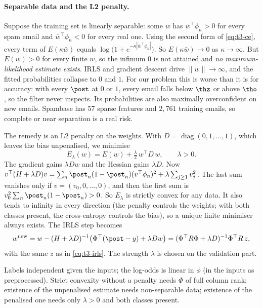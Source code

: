 \paragraph{Separable data and the L2 penalty.}
Suppose the training set is linearly separable: some $\bar w$ has $\bar w^\top\phi_n>0$ for every
spam email and $\bar w^\top\phi_n<0$ for every real one. Using the second form of
\eqref{eq:t3-ce}, every term of $E(\kappa\bar w)$ equals $\log\big(1+e^{-\kappa|\bar w^\top\phi_n|}\big)$.
So $E(\kappa\bar w)\to0$ as $\kappa\to\infty$. But $E(w)>0$ for every finite $w$, so the infimum
$0$ is not attained and \emph{no maximum-likelihood estimate exists}. IRLS and gradient descent
drive $\lVert w\rVert\to\infty$, and the fitted probabilities collapse to $0$ and $1$. For our
problem this is worse than it is for accuracy: with every $\post$ at $0$ or $1$, every email falls
below $\thz$ or above $\tho$, so the filter never inspects. Its probabilities are also maximally
overconfident on new emails. Spambase has 57 sparse features and $2{,}761$ training emails, so
complete or near separation is a real risk.

The remedy is an L2 penalty on the weights. With $D=\operatorname{diag}(0,1,\dots,1)$, which
leaves the bias unpenalised, we minimise
\begin{equation}
  E_\lambda(w) = E(w) + \tfrac{\lambda}{2}\, w^\top D\, w, \qquad \lambda>0 .
  \label{eq:t3-l2}
\end{equation}
The gradient gains $\lambda Dw$ and the Hessian gains $\lambda D$. Now
$v^\top(H+\lambda D)v = \sum_n \post_n(1-\post_n)(v^\top\phi_n)^2 + \lambda\sum_{j\ge1}v_j^2$. The last sum
vanishes only if $v=(v_0,0,\dots,0)$, and then the first sum is $v_0^2\sum_n\post_n(1-\post_n)>0$. So
$E_\lambda$ is strictly convex for any data. It also tends to infinity in every direction (the penalty
controls the weights; with both classes present, the cross-entropy controls the bias), so a unique
finite minimiser always exists. The IRLS step becomes
\[
  w^{\mathrm{new}} = w-(H+\lambda D)^{-1}\big(\Phi^\top(\post-y)+\lambda Dw\big)
  = (\Phi^\top R\Phi+\lambda D)^{-1}\Phi^\top R\,z ,
\]
with the same $z$ as in \eqref{eq:t3-irls}. The strength $\lambda$ is chosen on the validation
part.

\begin{assumptions}
Labels independent given the inputs; the log-odds is linear in $\phi$ (in the inputs as
preprocessed). Strict convexity without a penalty needs $\Phi$ of full column rank; existence of the
unpenalised estimate needs non-separable data; existence of the penalised one needs only $\lambda>0$
and both classes present.
\end{assumptions}

